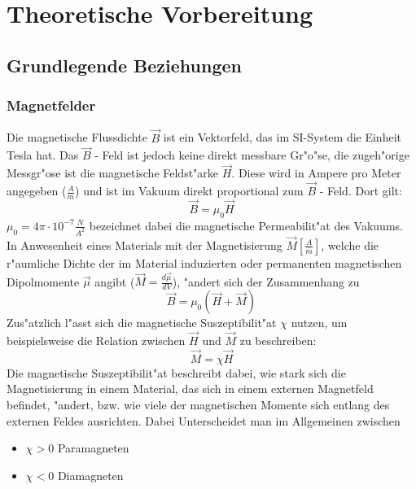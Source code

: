 \section{Theoretische Vorbereitung}
    \subsection{Grundlegende Beziehungen}
        \subsubsection{Magnetfelder}
            Die magnetische Flussdichte $\vec{B}$ ist ein Vektorfeld, das im SI-System die Einheit Tesla hat.
            Das $\vec{B}$ - Feld ist jedoch keine direkt messbare Gr"o"se, die zugeh"orige Messgr"ose ist die magnetische Feldst"arke $\vec{H}$.
            Diese wird in Ampere pro Meter angegeben ($\frac{A}{m}$) und ist im Vakuum direkt proportional
            zum $\vec{B}$ - Feld. Dort gilt:
            \begin{equation}
                \vec{B} = \mu_0 \vec{H}
            \end{equation}
            $\mu_0 = 4\pi \cdot 10^{-7}\frac{N}{A^2}$ bezeichnet dabei die magnetische Permeabilit"at des Vakuums.
            In Anwesenheit eines Materials mit der Magnetisierung $\vec{M} [\frac{A}{m}]$, welche die r"aumliche Dichte der im Material induzierten oder permanenten magnetischen Dipolmomente $\vec{\mu}$ angibt ($\vec{M} = \frac{d\vec{\mu}}{dV}$), "andert sich der Zusammenhang zu
            \begin{equation}
                \vec{B} = \mu_0 (\vec{H} + \vec{M})
            \end{equation}
            Zus"atzlich l"asst sich die magnetische Suszeptibilit"at $\chi$ nutzen, um beispielsweise die Relation zwischen $\vec{H}$ und $\vec{M}$ zu beschreiben:
            \begin{equation}
                \vec{M} = \chi \vec{H}
            \end{equation}
            Die magnetische Suszeptibilit"at beschreibt dabei, wie stark sich die Magnetisierung in einem
            Material, das sich in einem externen Magnetfeld befindet, "andert, bzw. wie viele der magnetischen Momente sich entlang des externen Feldes ausrichten.
            Dabei Unterscheidet man im Allgemeinen zwischen
            \begin{itemize}
                \item $\chi > 0$ Paramagneten
                \item $\chi < 0$ Diamagneten
            \end{itemize}
